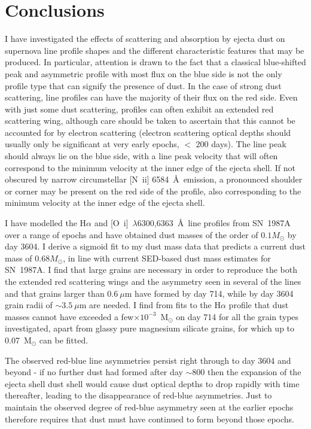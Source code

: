 \section{Conclusions}

I have investigated the effects of scattering and absorption by ejecta 
dust on supernova line profile shapes and the different characteristic 
features that may be produced.  In particular, attention is drawn to the 
fact that a classical blue-shifted peak and asymmetric profile with most 
flux on the blue side is not the only profile type that can signify the 
presence of dust. In the case of strong dust scattering, line profiles can 
have the majority of their flux on the red side. Even with just some dust 
scattering, profiles can often exhibit an extended red scattering wing, 
although care should be taken to ascertain that this cannot be accounted 
for by electron scattering (electron scattering optical depths should 
usually only be significant at very early epochs, $<$ 200 days). The line 
peak should always lie on the blue side, with a line peak velocity that 
will often correspond to the minimum velocity at the inner edge of the 
ejecta shell. If not obscured by narrow circumstellar [N~{\sc ii}] 
6584~\AA\ emission, a pronounced shoulder or corner may be present on the 
red side of the profile, also corresponding to the minimum velocity at the 
inner edge of the ejecta shell.

I have modelled the H$\alpha$ and [O~{\sc i}]~$\lambda$6300,6363~\AA\ 
line profiles from SN~1987A over a range of epochs and have obtained dust 
masses of the order of $0.1M_{\odot}$ by day 3604.  I derive a sigmoid 
fit to my dust mass data that predicts a current dust mass of 
0.68$M_{\odot}$, in line with current SED-based dust mass estimates for 
SN~1987A.  I find that large grains are necessary in order to reproduce 
the both the extended red scattering wings and the asymmetry seen in 
several of the lines and that grains larger than $0.6~\mu$m have formed by 
day 714, while by day 3604 grain radii of $\sim 3.5~\mu$m are needed. I 
find from fits to the H$\alpha$ profile that dust masses cannot have 
exceeded a few$\times10^{-3}$~M$_\odot$ on day 714 for all the grain types 
investigated, apart from glassy pure magnesium silicate grains, for which 
up to 0.07~M$_\odot$ can be fitted.

The observed red-blue line asymmetries persist right through to day 3604 
and beyond - if no further dust had formed after day $\sim$800 then the 
expansion of the ejecta shell dust shell would cause dust optical depths 
to drop rapidly with time thereafter, leading to the disappearance of 
red-blue asymmetries. Just to maintain the observed degree of red-blue 
asymmetry seen at the earlier epochs therefore requires that dust must 
have continued to form beyond those epochs.
